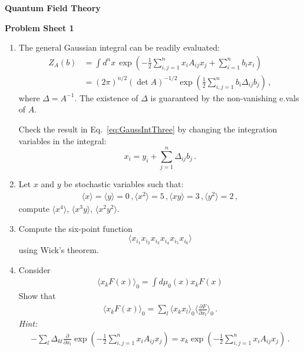 \documentclass[12pt,a4paper]{article}
\begin{document}
\begin{center}
{\bf Quantum Field Theory}\\[\baselineskip]
\end{center}
{\bf Problem Sheet 1}

\begin{enumerate}

\item The general Gaussian integral can be readily evaluated:
  \begin{align}
    Z_A(b) &= \int d^nx\, \exp\left(
             -\frac12 \sum_{i,j=1}^n x_i A_{ij} x_j
             + \sum_{i=1}^n b_i x_i
             \right) \\
    \label{eq:GaussIntThree}
           &=  \left(2\pi\right)^{n/2} \left(\det A \right)^{-1/2}
             \exp\left(
             \frac12 \sum_{i,j=1}^n b_i \Delta_{ij} b_j
             \right) \, ,
  \end{align}
  where $\Delta = A^{-1}$. The existence of $\Delta$ is guaranteed by
  the non-vanishing e.vals of $A$.

  Check the result in Eq.~\ref{eq:GaussIntThree} by changing the
  integration variables in the integral:
  \[
    x_i = y_i + \sum_{j=1}^n \Delta_{ij} b_j\, .
  \]

\item Let $x$ and $y$ be stochastic variables such that:
  \begin{align*}
    \langle x \rangle = \langle y \rangle =0\, ,
    \langle x^2 \rangle = 5\, ,
    \langle x y \rangle = 3 \, ,
    \langle y^2 \rangle = 2\, ,
  \end{align*}
  compute $\langle x^4\rangle$, $\langle x^3 y \rangle$, $\langle x^2
  y^2\rangle$.  

\item Compute the six-point function
  \[
    \langle x_{i_1} x_{i_2} x_{i_3} x_{i_4} x_{i_5} x_{i_6} \rangle    
  \]
  using Wick's theorem. 

\item Consider 
  \begin{align}
    \langle x_k F(x) \rangle_0 = 
    \int d\mu_0(x) x_k F(x) 
  \end{align}
  Show that
  \begin{align}
    \langle x_k F(x) \rangle_0  = 
    \sum_l \langle x_k x_l \rangle_0 \langle \frac{\partial F}{\partial x_l}\rangle_0\, .
  \end{align}
  {\em Hint:} 
  \begin{align}
    - \sum_l \Delta_{kl} \frac{\partial}{\partial x_l}
    \exp\left(
    -\frac12 \sum_{i,j=1}^n x_i A_{ij} x_j
    \right) = 
    x_k \exp\left(
    -\frac12 \sum_{i,j=1}^n x_i A_{ij} x_j
    \right)\, .
  \end{align}


\end{enumerate}
\end{document}
